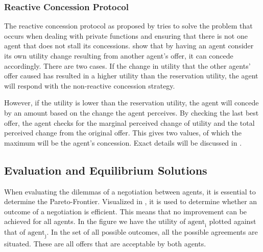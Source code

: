 \subsubsection{Reactive Concession Protocol}
The reactive concession protocol as proposed by \citet{zheng2015automated} tries to solve the problem that occurs when dealing with private functions and ensuring that there is not one agent that does not stall its concessions. \citet{zheng2015automated} show that by having an agent consider its own utility change resulting from another agent's offer, it can concede accordingly. There are two cases. If the change in utility that the other agents' offer caused has resulted in a higher utility than the reservation utility, the agent will respond with the non-reactive concession strategy. 

However, if the utility is lower than the reservation utility, the agent will concede by an amount based on the change the agent perceives. By checking the last best offer, the agent checks for the marginal perceived change of utility and the total perceived change from the original offer. This gives two values, of which the maximum will be the agent's concession. Exact details will be discussed in .


\subsection{Evaluation and Equilibrium Solutions}
When evaluating the dilemmas of a negotiation between agents, it is essential to determine the Pareto-Frontier. Visualized in , it is used to determine whether an outcome of a negotiation is efficient. This means that no improvement can be achieved for all agents. In the figure we have the utility of $\text{agent}_\text{i}$ plotted against that of  $\text{agent}_\text{j}$. In the set of all possible outcomes, all the possible agreements are situated. These are all offers that are acceptable by both agents.

